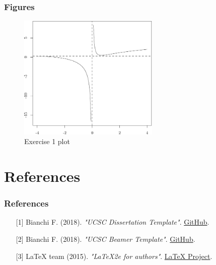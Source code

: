 \documentclass[11pt, xcolor=dvipsnames]{beamer}
\begin{document}
\begin{frame}
\frametitle{Figures}
\bigskip
\begin{figure}
\centering
\includegraphics[width=0.6\textwidth]{Figure_1.pdf}
\caption{Exercise 1 plot}
\label{Exercise-1}	
\end{figure}
\end{frame}


\section{References}

\begin{frame}
\frametitle{References}
\small
\begin{enumerate}
\item[{[1]}] Bianchi F. (2018). \textit{"UCSC Dissertation Template"}. \href{https://github.com/Francesco-Bianchi/UCSC_dissertation_template}{GitHub}.
\item[{[2]}] Bianchi F. (2018). \textit{"UCSC Beamer Template"}. \href{https://github.com/Francesco-Bianchi/UCSC_beamer_template}{GitHub}.
\item[{[3]}] LaTeX team (2015). \textit{"LaTeX2e for authors"}. \href{https://www.latex-project.org/help/documentation/usrguide.pdf}{LaTeX Project}.
\end{enumerate}
\end{frame}
\end{document}
